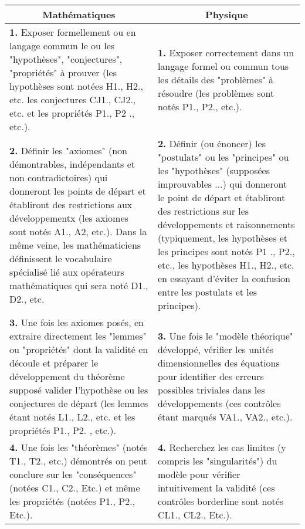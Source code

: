 	\begin{table}[H]
		\centering
			\begin{tabular}{|p{7.5cm}|p{7.5cm}|}
				\hline
				\multicolumn{1}{c}{\cellcolor{black!30}\textbf{Math\'ematiques}} & 
  \multicolumn{1}{c}{\cellcolor{black!30}\textbf{Physique}} \\ \hline
				\textbf{1.} Exposer formellement ou en langage commun le ou les "hypothèses", "conjectures", "propri\'et\'es" à prouver (les hypothèses sont not\'ees H1., H2., etc. les conjectures CJ1., CJ2., etc. et les propri\'et\'es P1., P2 ., etc.). & \textbf {1.} Exposer correctement dans un langage formel ou commun tous les d\'etails des "problèmes" à r\'esoudre (les problèmes sont not\'es P1., P2., etc.). \\ \hline
				\textbf{2.} D\'efinir les "axiomes" (non d\'emontrables, ind\'ependants et non contradictoires) qui donneront les points de d\'epart et \'etabliront des restrictions aux d\'eveloppementx (les axiomes sont not\'es A1., A2, etc.)\footnotemark. \newline\newline
Dans la même veine, les math\'ematiciens d\'efinissent le vocabulaire sp\'ecialis\'e li\'e aux op\'erateurs math\'ematiques qui sera not\'e D1., D2., etc. & \textbf{2.} D\'efinir (ou \'enoncer) les "postulats" ou les "principes" ou les "hypothèses" (suppos\'ees improuvables ...) qui donneront le point de d\'epart et \'etabliront des restrictions sur les d\'eveloppements et raisonnements (typiquement, les hypothèses et les principes sont not\'es P1 ., P2., etc., les hypothèses H1., H2., etc. en essayant d'\'eviter la confusion entre les postulats et les principes)\footnotemark. \\ \hline
				\textbf{3.} Une fois les axiomes pos\'es, en extraire directement les "lemmes" ou "propri\'et\'es" dont la validit\'e en d\'ecoule et pr\'eparer le d\'eveloppement du th\'eorème suppos\'e valider l'hypothèse  ou les conjectures de d\'epart (les lemmes \'etant not\'es L1., L2., etc. et les  propri\'et\'es P1., P2. , etc.). & \textbf{3.} Une fois le "modèle th\'eorique" d\'evelopp\'e, v\'erifier les unit\'es dimensionnelles des \'equations pour identifier des erreurs possibles triviales dans les d\'eveloppements (ces contrôles \'etant marqu\'es VA1., VA2., etc.).\\ \hline
				\textbf{4.} Une fois les "th\'eorèmes" (not\'es T1., T2., etc.) d\'emontr\'es on peut conclure sur les "cons\'equences" (not\'ees C1., C2., Etc.) et même les propri\'et\'es (not\'ees P1., P2., Etc.). & \textbf{4.} Recherchez les cas limites (y compris les "singularit\'es") du modèle pour v\'erifier intuitivement la validit\'e (ces contrôles borderline sont not\'es CL1., CL2., Etc.).\\ \hline

\end{tabular}
\end{table}
